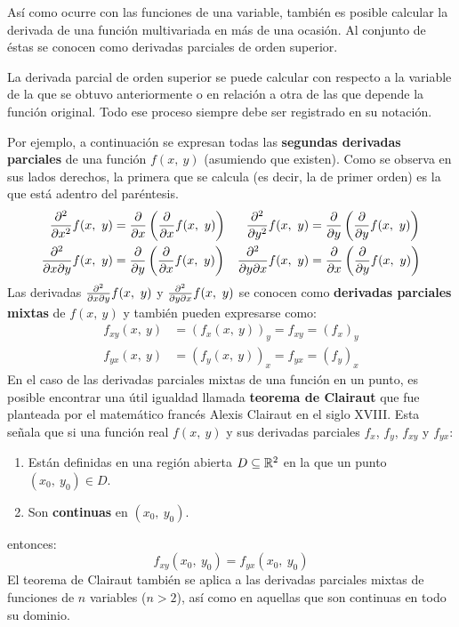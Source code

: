 \documentclass[12pt]{article}
\begin{document}
Así como ocurre con las funciones de una variable, también es posible calcular la derivada de una función multivariada en más de una ocasión. Al conjunto de éstas se conocen como derivadas parciales de orden superior.

La derivada parcial de orden superior se puede calcular con respecto a la variable de la que se obtuvo anteriormente o en relación a otra de las que depende la función original. Todo ese proceso siempre debe ser registrado en su notación.

Por ejemplo, a continuación se expresan todas las \textbf{segundas derivadas parciales} de una función $f(x, \ y)$ (asumiendo que existen). Como se observa en sus lados derechos, la primera que se calcula (es decir, la de primer orden) es la que está adentro del paréntesis.
\begin{align*}
\nderivpar{2}{x} f(x, \ y) &= \derivpar{x} \left(\derivpar{x} f(x, \ y)\right) &
  \nderivpar{2}{y} f(x, \ y) &= \derivpar{y} \left(\derivpar{y} f(x, \ y)\right) \\
\nbiderivpar{2}{x}{y} f(x, \ y) &= \derivpar{y} \left(\derivpar{x} f(x, \ y)\right) &
  \nbiderivpar{2}{y}{x} f(x, \ y) &= \derivpar{x} \left(\derivpar{y} f(x, \ y)\right)
\end{align*}
Las derivadas $\frac{\partial^{2} }{\partial x \partial y} f(x, \ y)$ y $\frac{\partial^{2} }{\partial y \partial x} f(x, \ y)$ se conocen como \textbf{derivadas parciales mixtas} de $f(x, \ y)$ y también pueden expresarse como:
\begin{align*}
  f_{xy}(x, \ y) &= (f_{x}(x, \ y))_{y} = f_{xy} = (f_{x})_{y} \\
  f_{yx}(x, \ y) &= (f_{y}(x, \ y))_{x} = f_{yx} = (f_{y})_{x}
\end{align*}
En el caso de las derivadas parciales mixtas de una función en un punto, es posible encontrar una útil igualdad llamada \textbf{teorema de Clairaut} que fue planteada por el matemático francés Alexis Clairaut en el siglo XVIII. Esta señala que si una función real $f(x, \ y)$ y sus derivadas parciales $f_{x}$, $f_{y}$, $f_{xy}$ y $f_{yx}$:

\begin{enumerate}
\item Están definidas en una región abierta $D \subseteq \mathbb{R}^{2}$ en la que un punto $(x_{0}, \ y_{0}) \in D$.
\item Son \textbf{continuas} en $(x_{0}, \ y_{0})$.
\end{enumerate}

entonces:
\[
  f_{xy}(x_{0}, \ y_{0}) = f_{yx}(x_{0}, \ y_{0})
\]
El teorema de Clairaut también se aplica a las derivadas parciales mixtas de funciones de $n$ variables ($n > 2$), así como en aquellas que son continuas en todo su dominio.
\end{document}
